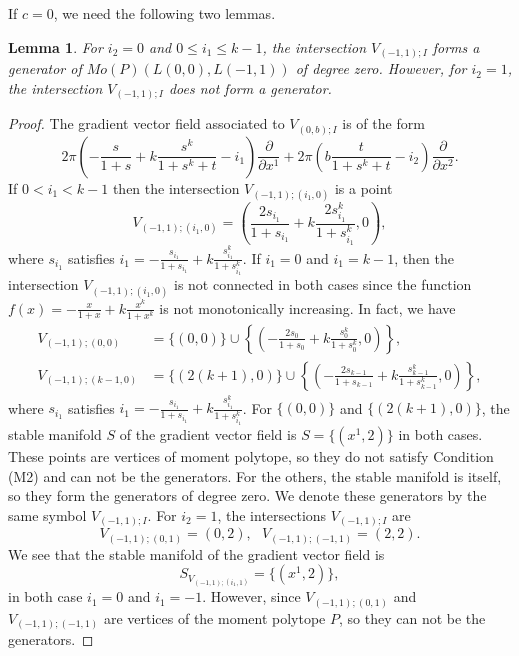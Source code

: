 \documentclass[12pt,reqno]{amsart}
\newcommand{\del}{{\partial}}
\newtheorem{lem}[thm]{Lemma}%
\theoremstyle{definition}
\begin{document}
If $c=0$, we need the following two lemmas.
\begin{lem}
For $i_2=0$ and $0\leq i_1\leq k-1$, the intersection $V_{(-1,1);I}$ forms a generator of $Mo(P)(L(0,0),L(-1,1))$ of degree zero. However, for $i_2=1$, the intersection $V_{(-1,1);I}$ does not form a generator.
\end{lem}
\begin{proof}
The gradient vector field associated to $V_{(0,b);I}$ is of the form
\begin{equation*}
2\pi\left(-\frac{s}{1+s}+k\frac{s^k}{1+s^k+t}-i_1\right)\frac{\del}{\del x^1} + 2\pi\left(b\frac{t}{1+s^k+t} - i_2 \right)\frac{\del}{\del x^2}.
\end{equation*}
If $0<i_1<k-1$ then the intersection $V_{(-1,1);(i_1,0)}$ is a point
\begin{equation*}
V_{(-1,1);(i_1,0)} = \left( \frac{2s_{i_1}}{1+s_{i_1}} + k\frac{2s_{i_1}^k}{1+s_{i_1}^k} , 0 \right),
\end{equation*} 
where $s_{i_1}$ satisfies $i_1 = -\frac{s_{i_1}}{1+s_{i_1}} + k\frac{s_{i_1}^k}{1+s_{i_1}^k}$.
If $i_1=0$ and $i_1=k-1$, then the intersection $V_{(-1,1);(i_1,0)}$ is not connected in both cases since the function $f(x)=-\frac{x}{1+x}+k\frac{x^k}{1+x^k}$ is not monotonically increasing. In fact, we have
\begin{equation*}
\begin{split}
V_{(-1,1);(0,0)} &= \{(0,0)\}\cup\left\{\left(-\frac{2s_{0}}{1+s_{0}} + k\frac{s_{0}^k}{1+s_{0}^k},0\right)\right\},\\
V_{(-1,1);(k-1,0)} &= \{(2(k+1),0)\}\cup\left\{\left(-\frac{2s_{k-1}}{1+s_{k-1}} + k\frac{s_{k-1}^k}{1+s_{k-1}^k},0\right)\right\},
\end{split}
\end{equation*}
where $s_{i_1}$ satisfies $i_1 = -\frac{s_{i_1}}{1+s_{i_1}} + k\frac{s_{i_1}^k}{1+s_{i_1}^k}$. For $\{(0,0)\}$ and $\{(2(k+1),0)\}$, the stable manifold $S$ of the gradient vector field is $S=\{(x^1,2)\}$ in both cases. These points are vertices of moment polytope, so they do not satisfy Condition (M2) and can not be the generators. For the others, the stable manifold is itself, so they form the generators of degree zero. We denote these generators by the same symbol $V_{(-1,1);I}$.
For $i_2=1$, the intersections $V_{(-1,1);I}$ are
\begin{equation*}
V_{(-1,1);(0,1)} = \left( 0 , 2 \right),\ \ \ V_{(-1,1);(-1,1)} = \left( 2 , 2 \right).
\end{equation*}
We see that the stable manifold of the gradient vector field is
\begin{equation*}
S_{V_{(-1,1);(i_1,1)}}=\{(x^1,2)\},
\end{equation*}
in both case $i_1=0$ and $i_1=-1$. However, since $V_{(-1,1);(0,1)}$ and $V_{(-1,1);(-1,1)}$ are vertices of the moment polytope $P$, so they can not be the generators.
\end{proof}
\end{document}
